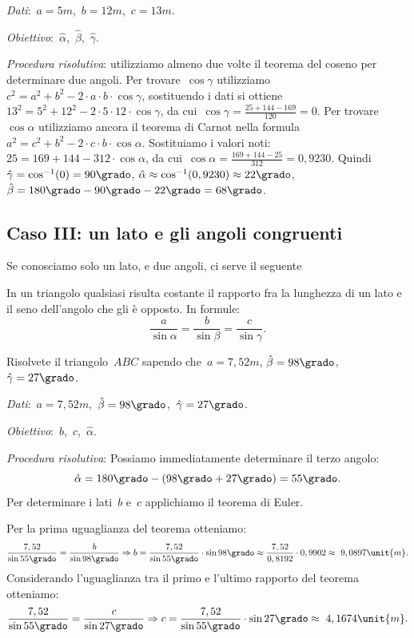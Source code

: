 \emph{Dati}:~$a= 5\unit{m}$,\quad~$b=12\unit{m}$,\quad~$c=13\unit{m}$.

\emph{Obiettivo}:~$\hat{\alpha}$,\quad~$\hat{\beta}$,\quad~$\hat{\gamma}$.

\emph{Procedura risolutiva}:
utilizziamo almeno due volte il teorema del coseno per determinare due angoli. 
Per trovare~$\cos \gamma$ utilizziamo
$c^{2}=a^{2}+b^{2}-2\cdot a\cdot b\cdot \cos \gamma$, sostituendo i dati si 
ottiene~$13^{2}=5^{2}+12^{2}-2\cdot 5\cdot 12\cdot \cos \gamma$,
da cui~$\cos \gamma=\frac{25+144-169}{120}=0$.
Per trovare~$\cos \alpha$ utilizziamo ancora il teorema di Carnot nella formula
$a^{2}=c^{2}+b^{2}-2\cdot c\cdot b\cdot \cos \alpha$. Sostituiamo i valori 
noti:~$25=169+144-312\cdot \cos \alpha$,
da cui~$\cos \alpha=\frac{169+144-25}{312}=0,9230$.
Quindi~$\hat{\gamma}=\cos^{-1}(0)=90\grado$, 
$\hat{\alpha}\approx\cos^{-1}(0,9230)\approx22\grado$, 
$\hat{\beta}=180\grado-90\grado-22\grado=68\grado$.

\subsection{Caso III: un lato e gli angoli congruenti}
Se conosciamo solo un lato, e due angoli, ci serve il seguente

\begin{teorema}
In un triangolo qualsiasi risulta costante il rapporto fra la lunghezza di un 
lato e il seno dell'angolo che gli è opposto. In formule:
\[\frac{a}{\sin \alpha}=\frac{b}{\sin \beta}=\frac{c}{\sin \gamma}.\]
\end{teorema}

\begin{problema}
Risolvete il triangolo~$ABC$ sapendo che~$a= 7,52\unit{m}$, 
$\hat{\beta}=98\grado$, ${\hat{\gamma}}=27\grado$.
\end{problema}

\emph{Dati}:~$a= 
7,52\unit{m}$,\quad~$\hat{\beta}=98\grado$,\quad~${\hat{\gamma}}=27\grado$.

\emph{Obiettivo}:~$b$,\quad~$c$,\quad~$\hat{\alpha}$.

\emph{Procedura risolutiva}:
Possiamo immediatamente determinare il terzo angolo: 
\[{\hat{\alpha}}=180\grado-(98\grado+27\grado)=55\grado.\]
Per determinare i lati~$b$ e~$c$ applichiamo il teorema di Euler.

Per la prima uguaglianza del teorema otteniamo:
\[
\frac{7,52}{\sin 55\grado}=\frac{b}{\sin 98\grado} \Rightarrow 
b=\frac{7,52}{\sin 55\grado}\cdot \sin 98\grado\approx
\frac{7,52}{0,8192}\cdot 0,9902\approx~9,0897\unit{m}.
\]
Considerando l'uguaglianza tra il primo e l'ultimo rapporto del teorema 
otteniamo:
\[
\frac{7,52}{\sin 55\grado}=\frac{c}{\sin 27\grado} \Rightarrow 
c=\frac{7,52}{\sin 55\grado}\cdot \sin 27\grado\approx~4,1674\unit{m}.
\]
